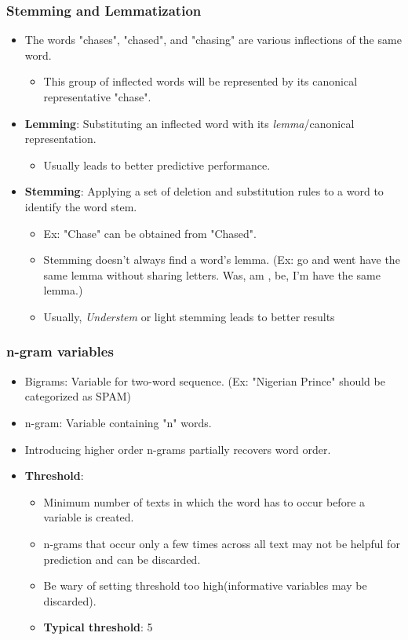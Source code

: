 \documentclass[12pt, oneside]{article}
\begin{document}
\subsubsection{Stemming and Lemmatization}
\begin{itemize}
    \item The words "chases", "chased", and "chasing" are various inflections of the same word. 
    \begin{itemize}
        \item This group of inflected words will be represented by its canonical representative "chase". 
    \end{itemize}
    \item \textbf{Lemming}: Substituting an inflected word with its \emph{lemma}/canonical representation. 
    \begin{itemize}
        \item Usually leads to better predictive performance. 
    \end{itemize}
    \item \textbf{Stemming}: Applying a set of deletion and substitution rules to a word to identify the word stem. 
        \begin{itemize}
            \item Ex: "Chase" can be obtained from "Chased".
            \item Stemming doesn't always find a word's lemma. (Ex: go and went have the same lemma without sharing letters. Was, am , be, I'm have the same lemma.)
            \item Usually, \emph{Understem} or light stemming leads to better results
        \end{itemize}
\end{itemize}

\subsubsection{n-gram variables}
\begin{itemize}
    \item Bigrams: Variable for two-word sequence. (Ex: "Nigerian Prince" should be categorized as SPAM)
    \item n-gram: Variable containing "n" words.  
    \item Introducing higher order n-grams partially recovers word order. 
    \item \textbf{Threshold}: 
    \begin{itemize}
        \item Minimum number of texts in which the word has to occur before a variable is created.
        \item n-grams that occur only a few times across all text may not be helpful for prediction and can be discarded.
        \item Be wary of setting threshold too high(informative variables may be discarded).
        \item \textbf{Typical threshold}: 5
    \end{itemize}  
\end{itemize}
\end{document}
